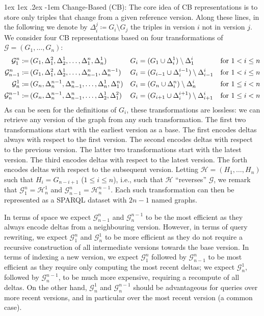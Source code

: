 \documentclass[a4paper]{llncs}
\makeatletter
\renewcommand\paragraph{\@startsection{paragraph}{4}{\z@}%
	{1ex \@plus1ex \@minus.2ex}%
	{-1em}%
	{\normalfont\normalsize\itshape}}
\newcommand{\da}{\ensuremath{:\nolinebreak\mkern-1.2mu\nolinebreak=}}
\makeatother
\begin{document}
\paragraph{Change-Based (CB):} The core idea of CB representations is to store only triples that change from a given reference version. Along these lines, in the following we denote by $\Delta_{i}^j \coloneqq G_i \setminus G_j$ the triples in version $i$ not in version $j$. We consider four CB representations based on four transformations of $\mathcal{G} = (G_1,\ldots,G_n)$:
%
{\footnotesize
\begin{align*}
\mathcal{G}^n_1 \da\,& (G_1,\Delta_1^2,\Delta_2^1,\ldots,\Delta_1^n,\Delta_n^1) & G_i & = (G_1 \cup \Delta_i^1) \setminus \Delta_1^i & \text{for }1 < i \leq n\\
\mathcal{G}^n_{n-1} \da\,& (G_1,\Delta_1^2,\Delta_2^1,\ldots,\Delta_{n-1}^n,\Delta_n^{n-1}) & G_i & = (G_{i-1} \cup \Delta_i^{i-1}) \setminus \Delta_{i-1}^i & \text{for }1 < i \leq n \\
\mathcal{G}^1_n \da\,& (G_n,\Delta_n^{n-1},\Delta_{n-1}^n,\ldots,\Delta_n^1,\Delta_1^n) & G_i & = (G_n \cup \Delta_i^n) \setminus \Delta_n^i & \text{for }1 \leq i < n \\
\mathcal{G}^{n-1}_n \da\,& (G_n,\Delta_n^{n-1},\Delta_{n-1}^n,\ldots,\Delta_2^1,\Delta_1^2) & G_i & = (G_{i+1} \cup \Delta_i^{i+1}) \setminus \Delta_{i+1}^i & \text{for }1 \leq i < n
\end{align*}%
}%
%
As can be seen for the definitions of $G_i$, these transformations are lossless: we can retrieve any version of the graph from any such transformation. The first two transformations start with the earliest version as a base. The first encodes deltas always with respect to the first version. The second encodes deltas with respect to the previous version. The latter two transformations start with the latest version. The third encodes deltas with respect to the latest version. The forth encodes deltas with respect to the subsequent version. Letting $\mathcal{H} = (H_1,\ldots,H_n)$ such that $H_i = G_{n-i+1}$ ($1 \leq i \leq n$), i.e., such that $\mathcal{H}$ ``reverses'' $\mathcal{G}$, we remark that $\mathcal{G}^n_1 = \mathcal{H}^1_n$ and $\mathcal{G}^n_{n-1} = \mathcal{H}^{n-1}_n$. Each such transformation can then be represented as a SPARQL dataset with $2n - 1$ named graphs.

In terms of space we expect $\mathcal{G}^n_{n-1}$ and $\mathcal{G}^{n-1}_n$ to be the most efficient as they always encode deltas from a neighbouring version. However, in terms of query rewriting, we expect $\mathcal{G}^n_{1}$ and $\mathcal{G}^{1}_n$ to be more efficient as they do not require a recursive construction of all intermediate versions towards the base version. In terms of indexing a new version, we expect $\mathcal{G}^{n}_1$ followed by $\mathcal{G}^{n}_{n-1}$ to be most efficient as they require only computing the most recent deltas; we expect $\mathcal{G}^{1}_n$, followed by $\mathcal{G}^{n-1}_{n}$, to be much more expensive, requiring a recompute of all deltas. On the other hand, $\mathcal{G}^{1}_n$ and $\mathcal{G}^{n-1}_{n}$ should be advantageous for queries over more recent versions, and in particular over the most recent version (a common case).
\end{document}
